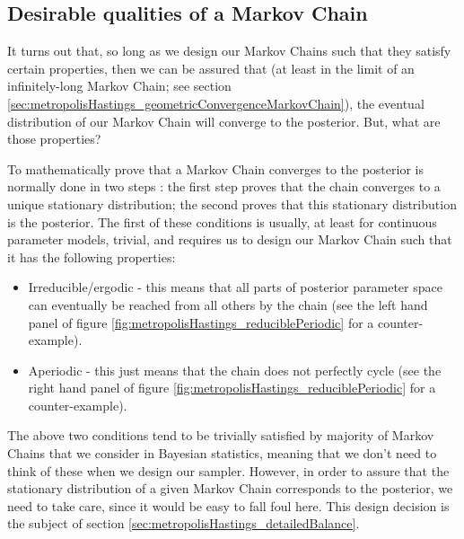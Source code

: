 \documentclass[11pt,fullpage]{book}
\begin{document}
\subsection{Desirable qualities of a Markov Chain}
It turns out that, so long as we design our Markov Chains such that they satisfy certain properties, then we can be assured that (at least in the limit of an infinitely-long Markov Chain; see section \ref{sec:metropolisHastings_geometricConvergenceMarkovChain}), the eventual distribution of our Markov Chain will converge to the posterior. But, what are those properties?

To mathematically prove that a Markov Chain converges to the posterior is normally done in two steps \cite{gelman2013bayesian}: the first step proves that the chain converges to a unique stationary distribution; the second proves that this stationary distribution is the posterior. The first of these conditions is usually, at least for continuous parameter models, trivial, and requires us to design our Markov Chain such that it has the following properties:
%
\begin{itemize}
\item Irreducible/ergodic - this means that all parts of posterior parameter space can eventually be reached from all others by the chain (see the left hand panel of figure \ref{fig:metropolisHastings_reduciblePeriodic} for a counter-example).
\item Aperiodic - this just means that the chain does not perfectly cycle (see the right hand panel of figure \ref{fig:metropolisHastings_reduciblePeriodic} for a counter-example). 
\end{itemize}
%
The above two conditions tend to be trivially satisfied by majority of Markov Chains that we consider in Bayesian statistics, meaning that we don't need to think of these when we design our sampler. However, in order to assure that the stationary distribution of a given Markov Chain corresponds to the posterior, we need to take care, since it would be easy to fall foul here. This design decision is the subject of section \ref{sec:metropolisHastings_detailedBalance}.
\end{document}

